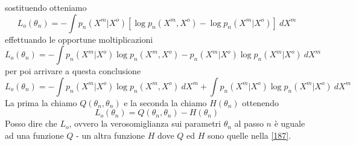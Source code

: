 sostituendo otteniamo
\begin{equation}
L_o (\theta_n) = -\int p_n(X^m|X^o) \left[ \log p_n(X^m, X^o)  - \log p_n(X^m | X^o) \right] \ dX^m
\end{equation}
effettuando le opportune moltiplicazioni
\begin{equation}
L_o (\theta_n) = -\int p_n(X^m|X^o) \log p_n(X^m, X^o)  - p_n(X^m|X^o) \log p_n(X^m | X^o)  \ dX^m
\end{equation}
per poi arrivare a questa conclusione
\begin{equation}\label{187}
L_o (\theta_n) = -\int p_n(X^m|X^o) \log p_n(X^m, X^o) \ dX^m + \int p_n(X^m|X^o) \log p_n(X^m | X^o)  \ dX^m
\end{equation}
La prima la chiamo $Q(\theta_n, \theta_n)$ e la seconda la chiamo $H(\theta_n)$
ottenendo
\begin{equation}
L_o (\theta_n) = Q(\theta_n, \theta_n) - H(\theta_n)
\end{equation}
Posso dire che $L_o$, ovvero la verosomiglianza sui parametri $\theta_n$ al passo $n$ è uguale ad una funzione $Q$ - un altra funzione $H$ dove $Q$ ed $H$ sono quelle nella \ref{187}.\\

